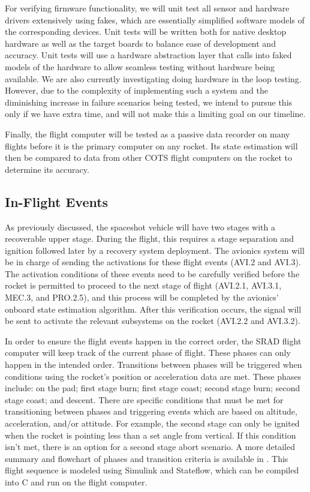For verifying firmware functionality, we will unit test all sensor and hardware drivers extensively using fakes, which are essentially simplified software models of the corresponding devices. Unit tests will be written both for native desktop hardware as well as the target boards to balance ease of development and accuracy. Unit tests will use a hardware abstraction layer that calls into faked models of the hardware to allow seamless testing without hardware being available. We are also currently investigating doing hardware in the loop testing. However, due to the complexity of implementing such a system and the diminishing increase in failure scenarios being tested, we intend to pursue this only if we have extra time, and will not make this a limiting goal on our timeline.

Finally, the flight computer will be tested as a passive data recorder on many flights before it is the primary computer on any rocket. Its state estimation will then be compared to data from other COTS flight computers on the rocket to determine its accuracy.


\subsection{In-Flight Events} %
As previously discussed, the spaceshot vehicle will have two stages with a recoverable upper stage. During the flight, this requires a stage separation and ignition followed later by a recovery system deployment. The avionics system will be in charge of sending the activations for these flight events (AVI.2 and AVI.3). The activation conditions of these events need to be carefully verified before the rocket is permitted to proceed to the next stage of flight (AVI.2.1, AVI.3.1, MEC.3, and PRO.2.5), and this process will be completed by the avionics' onboard state estimation algorithm. After this verification occurs, the signal will be sent to activate the relevant subsystems on the rocket (AVI.2.2 and AVI.3.2).

In order to ensure the flight events happen in the correct order, the SRAD flight computer will keep track of the current phase of flight. These phases can only happen in the intended order. Transitions between phases will be triggered when conditions using the rocket's position or acceleration data are met. These phases include: on the pad; first stage burn; first stage coast; second stage burn; second stage coast; and descent. There are specific conditions that must be met for transitioning between phases and triggering events which are based on altitude, acceleration, and/or attitude. For example, the second stage can only be ignited when the rocket is pointing less than a set angle from vertical. If this condition isn't met, there is an option for a second stage abort scenario. A more detailed summary and flowchart of phases and transition criteria is available in . This flight sequence is modeled using Simulink and Stateflow, which can be compiled into C and run on the flight computer.


